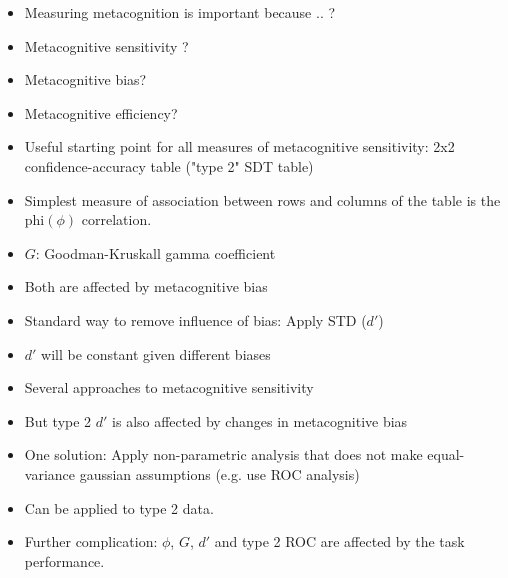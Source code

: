 \documentclass[../main/main.tex]{subfiles}
\begin{document}
\begin{itemize}
	\item Measuring metacognition is important because .. ?
	\item Metacognitive sensitivity ?
	\item Metacognitive bias?
	\item Metacognitive efficiency?
	\item Useful starting point for all measures of metacognitive sensitivity: 2x2 confidence-accuracy table ("type 2" SDT table)
	\item Simplest measure of association between rows and columns of the table is the phi$(\phi)$ correlation.
	\item $G$: Goodman-Kruskall gamma coefficient
	\item Both are affected by metacognitive bias
	\item Standard way to remove influence of bias: Apply STD ($d'$)
	\item $d'$ will be constant given different biases
	\item Several approaches to metacognitive sensitivity
	\item But type 2 $d'$ is also affected by changes in metacognitive bias
	\item One solution: Apply non-parametric analysis that does not make equal-variance gaussian assumptions (e.g. use ROC analysis)
	\item Can be applied to type 2 data.
	\item Further complication: $\phi$, $G$, $d'$ and type 2 ROC are affected by the task performance.
\end{itemize}
\end{document}
